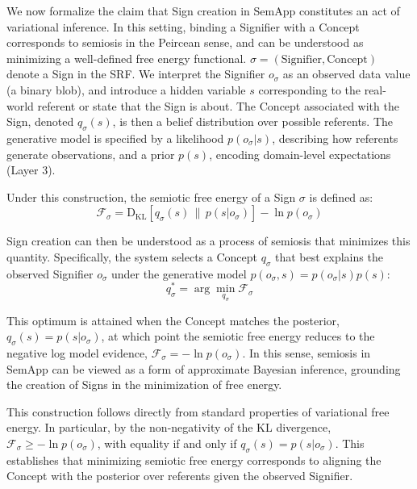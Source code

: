 \documentclass[11pt,a4paper]{article}
\theoremstyle{definition}
\newcommand{\KL}{\mathrm{D}_{\mathrm{KL}}}
\newcommand{\bq}{q}
\newcommand{\bp}{p}
\begin{document}
We now formalize the claim that Sign creation in SemApp constitutes an act of variational inference. In this setting, binding a Signifier with a Concept corresponds to semiosis in the Peircean sense, and can be understood as minimizing a well-defined free energy functional.
$\sigma = (\text{Signifier}, \text{Concept})$ denote a Sign in the SRF. We interpret the Signifier $o_\sigma$ as an observed data value (a binary blob), and introduce a hidden variable $s$ corresponding to the real-world referent or state that the Sign is about. The Concept associated with the Sign, denoted $\bq_\sigma(s)$, is then a belief distribution over possible referents. The generative model is specified by a likelihood $\bp(o_\sigma | s)$, describing how referents generate observations, and a prior $\bp(s)$, encoding domain-level expectations (Layer 3).

Under this construction, the semiotic free energy of a Sign $\sigma$ is defined as:
\begin{equation}
\label{eq:semiotic_fe}
\mathcal{F}_\sigma = \KL\!\left[\bq_\sigma(s) \,\|\, \bp(s|o_\sigma)\right] - \ln \bp(o_\sigma)
\end{equation}

Sign creation can then be understood as a process of semiosis that minimizes this quantity. Specifically, the system selects a Concept $\bq_\sigma$ that best explains the observed Signifier $o_\sigma$ under the generative model $\bp(o_\sigma, s) = \bp(o_\sigma|s)\bp(s)$:
\begin{equation}
\label{eq:semiosis}
\bq_\sigma^* = \arg\min_{\bq_\sigma} \mathcal{F}_\sigma
\end{equation}

This optimum is attained when the Concept matches the posterior, $\bq_\sigma(s) = \bp(s|o_\sigma)$, at which point the semiotic free energy reduces to the negative log model evidence, $\mathcal{F}_\sigma = -\ln \bp(o_\sigma)$. In this sense, semiosis in SemApp can be viewed as a form of approximate Bayesian inference, grounding the creation of Signs in the minimization of free energy.

This construction follows directly from standard properties of variational free energy. In particular, by the non-negativity of the KL divergence, $\mathcal{F}_\sigma \geq -\ln \bp(o_\sigma)$, with equality if and only if $\bq_\sigma(s) = \bp(s|o_\sigma)$. This establishes that minimizing semiotic free energy corresponds to aligning the Concept with the posterior over referents given the observed Signifier.
\end{document}
